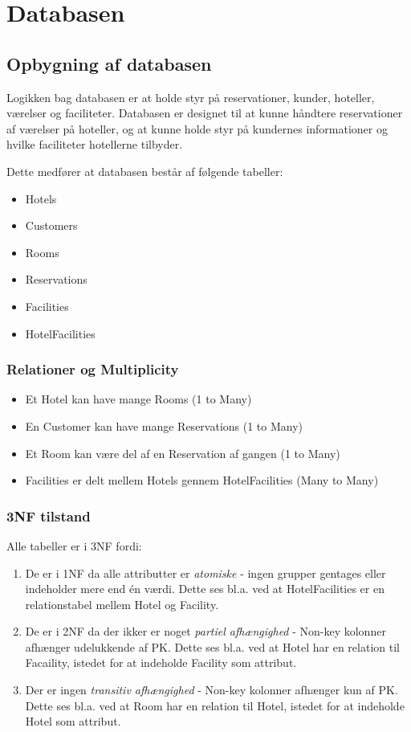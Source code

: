 \chapter{Databasen}

\section{Opbygning af databasen}

Logikken  bag databasen er at holde styr på reservationer, kunder, hoteller, værelser og faciliteter. 
Databasen er designet til at kunne håndtere reservationer af værelser på hoteller, 
og at kunne holde styr på kundernes informationer og hvilke faciliteter hotellerne tilbyder.

Dette medfører at databasen består af følgende tabeller:
\begin{itemize}
    \item Hotels
    \item Customers
    \item Rooms
    \item Reservations
    \item Facilities
    \item HotelFacilities
\end{itemize}

\subsection{Relationer og Multiplicity}

\begin{itemize}
    \item Et Hotel kan have mange Rooms (1 to Many)
    \item En Customer kan have mange Reservations (1 to Many)
    \item Et Room kan være del af en Reservation af gangen (1 to Many)
    \item Facilities er delt mellem Hotels gennem HotelFacilities (Many to Many)
\end{itemize}

\subsection{3NF tilstand}
Alle tabeller er i 3NF fordi:
\begin{enumerate}
    \item De er i 1NF da alle attributter er \emph{atomiske} - ingen grupper gentages eller indeholder mere end én værdi.
            Dette ses bl.a. ved at HotelFacilities er en relationstabel mellem Hotel og Facility.
    \item De er i 2NF da der ikker er noget \emph{partiel afhængighed} - Non-key kolonner afhænger udelukkende af PK. 
            Dette ses bl.a. ved at Hotel har en relation til Facaility, istedet for at indeholde Facility som attribut.
    \item Der er ingen \emph{transitiv afhængighed} - Non-key kolonner afhænger kun af PK.
            Dette ses bl.a. ved at Room har en relation til Hotel, istedet for at indeholde Hotel som attribut.
\end{enumerate}


